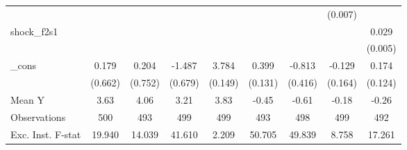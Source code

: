 {\begin{tabular}{l*{8}{c}}
            &                     &                     &                     &                     &                     &                     &     (0.007)         &                     \\
\addlinespace
shock\_f2s1  &                     &                     &                     &                     &                     &                     &                     &       0.029\sym{***}\\
            &                     &                     &                     &                     &                     &                     &                     &     (0.005)         \\
\addlinespace
\_cons      &       0.179         &       0.204         &      -1.487\sym{**} &       3.784\sym{***}&       0.399\sym{***}&      -0.813\sym{*}  &      -0.129         &       0.174         \\
            &     (0.662)         &     (0.752)         &     (0.679)         &     (0.149)         &     (0.131)         &     (0.416)         &     (0.164)         &     (0.124)         \\
\midrule
Mean Y      &        3.63         &        4.06         &        3.21         &        3.83         &       -0.45         &       -0.61         &       -0.18         &       -0.26         \\
Observations&         500         &         493         &         499         &         499         &         493         &         498         &         499         &         492         \\
Exc. Inst. F-stat&      19.940         &      14.039         &      41.610         &       2.209         &      50.705         &      49.839         &       8.758         &      17.261         \\
\bottomrule
\end{tabular}
}
